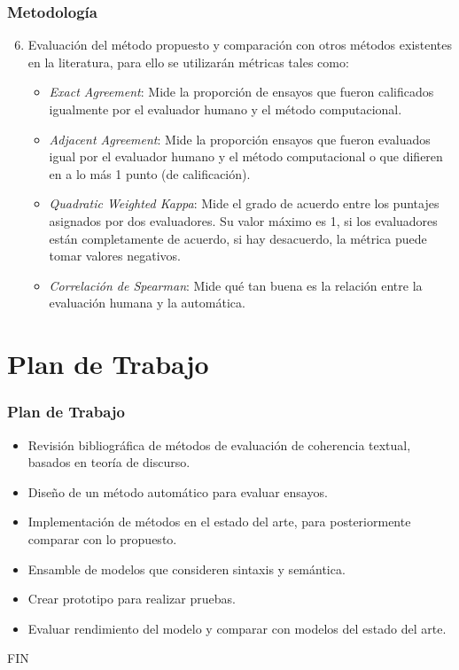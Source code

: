 \documentclass{beamer}
\begin{document}
\begin{frame}
\frametitle{Metodología}
\begin{enumerate}
\setcounter{enumi}{5}
	\item Evaluación del método propuesto y comparación con otros métodos existentes en la literatura, para ello se utilizarán métricas tales como:
	
	\begin{itemize}
		\item {\em Exact Agreement}: Mide la proporción de ensayos que fueron calificados igualmente por el evaluador humano y el método computacional.
		\item {\em Adjacent Agreement}: Mide la proporción ensayos que fueron evaluados igual por el evaluador humano y el método computacional o que difieren en a lo más 1 punto (de calificación).
		\item {\em Quadratic Weighted Kappa}: Mide el grado de acuerdo entre los puntajes asignados por dos evaluadores. Su valor máximo es 1, si los evaluadores están completamente de acuerdo, si hay desacuerdo, la métrica puede tomar valores negativos.
		\item {\em Correlación de Spearman}: Mide qué tan buena es la relación entre la evaluación humana y la automática.
	\end{itemize}

\end{enumerate}

\end{frame}

\section{Plan de Trabajo}
\begin{frame}
\frametitle{Plan de Trabajo}
\begin{itemize}
	\item Revisión bibliográfica de métodos de evaluación de coherencia textual, basados en teoría de discurso.
	\item Diseño de un método automático para evaluar ensayos.
	\item Implementación de métodos en el estado del arte, para posteriormente comparar con lo propuesto.
	\item Ensamble de modelos que consideren sintaxis y semántica.
	\item Crear prototipo para realizar pruebas.
	\item Evaluar rendimiento del modelo y comparar con modelos del estado del arte.
\end{itemize}
\end{frame}

\begin{frame}
\Huge{\centerline{FIN}}
\end{frame}

\end{document}
